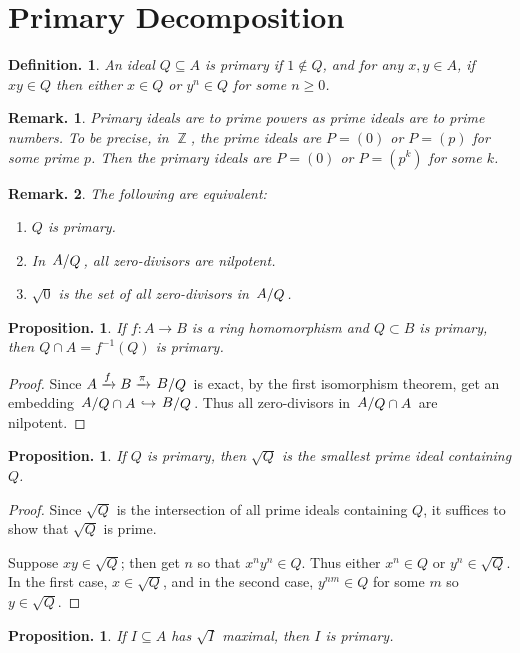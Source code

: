 \documentclass[11pt, a4paper]{memoir}
\DeclareMathOperator{\Z}{{\mathbb{Z}}}
\newcommand{\fto}[1]{\ensuremath{\xrightarrow{\scriptstyle{#1}}}}
\newcommand{\hto}[0]{\ensuremath{\hookrightarrow}}
\theoremstyle{change}
\newtheorem{proposition}[theorem]{Proposition.}
\theoremstyle{plain}
\theoremstyle{nonumberplain}
\newtheorem{definition}{Definition.}
\newtheorem{remark}{Remark.}
\newtheorem{proof}{Proof}
\newcommand{\quot}[2]{\mathchoice{\left.\raisebox{0.10em}{$#1$}\middle/\raisebox{-0.10em}{$#2$}\right.}
                                 {\left.\raisebox{0.04em}{$#1$}\middle/\raisebox{-0.04em}{$#2$}\right.}
                                 {\left.\raisebox{0.01em}{$#1$}\middle/\raisebox{-0.01em}{$#2$}\right.}
                                 {\left.\raisebox{0em}{$#1$}\middle/\raisebox{0em}{$#2$}\right.}}
\numberwithin{equation}{section}
\begin{document}
\section{Primary Decomposition}
\begin{definition}
    An ideal $Q \subseteq A$ is primary if $1\notin Q$, and for any $x,y \in A$, if $xy \in Q$ then either $x \in Q$ or $y^n\in Q$ for some $n \geq 0$.
\end{definition}
\begin{remark}
    Primary ideals are to prime powers as prime ideals are to prime numbers.
    To be precise, in $\Z$, the prime ideals are $P=(0)$ or $P=(p)$ for some prime $p$.
    Then the primary ideals are $P=(0)$ or $P=(p^k)$ for some $k$.
\end{remark}
\begin{remark}
    The following are equivalent:
    \begin{enumerate}[nl,r]
        \item $Q$ is primary.
        \item In $\quot{A}{Q}$, all zero-divisors are nilpotent.
        \item $\sqrt{0}$ is the set of all zero-divisors in $\quot{A}{Q}$.
    \end{enumerate}
\end{remark}
\begin{proposition}
    If $f:A\to B$ is a ring homomorphism and $Q\subset B$ is primary, then $Q\cap A=f^{-1}(Q)$ is primary.
\end{proposition}
\begin{proof}
    Since $A\fto{f}B\fto{\pi}\quot{B}{Q}$ is exact, by the first isomorphism theorem, get an embedding $\quot{A}{Q\cap A}\hto \quot{B}{Q}$.
    Thus all zero-divisors in $\quot{A}{Q\cap A}$ are nilpotent.
\end{proof}
\begin{proposition}
    If $Q$ is primary, then $\sqrt{Q}$ is the smallest prime ideal containing $Q$.
\end{proposition}
\begin{proof}
    Since $\sqrt{Q}$ is the intersection of all prime ideals containing $Q$, it suffices to show that $\sqrt{Q}$ is prime.

    Suppose $xy\in\sqrt{Q}$; then get $n$ so that $x^ny^n\in Q$.
    Thus either $x^n\in Q$ or $y^n\in\sqrt{Q}$.
    In the first case, $x\in\sqrt{Q}$, and in the second case, $y^{nm}\in Q$ for some $m$ so $y\in\sqrt{Q}$.
\end{proof}
\begin{proposition}
    If $I\subseteq A$ has $\sqrt{I}$ maximal, then $I$ is primary.
\end{proposition}
\end{document}

